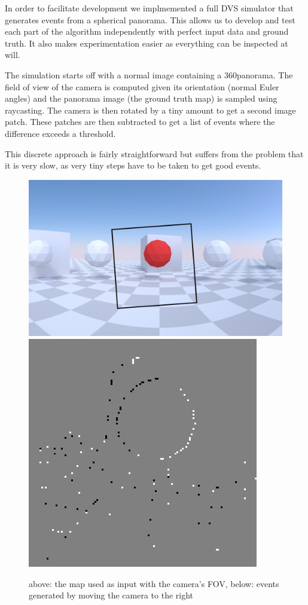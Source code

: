In order to facilitate development we implmemented a full DVS simulator that
generates events from a spherical panorama.  This allows us to develop and test
each part of the algorithm independently with perfect input data and ground
truth. It also makes experimentation easier as everything can be inspected at
will.

The simulation starts off with a normal image containing a 360\textdegree panorama.
The field of view of the camera is computed given its orientation (normal Euler angles)
and the panorama image (the ground truth map) is sampled using raycasting.
The camera is then rotated by a tiny amount to get a second image patch.
These patches are then subtracted to get a list of events where the difference exceeds a threshold.

This discrete approach is fairly straightforward but suffers from the problem that it is very slow, as very tiny steps have to be taken to get good events.

\begin{figure}
\label{fig:simulation}
\includegraphics[width=\linewidth]{images/simulation_raw.jpg}
\includegraphics[width=\linewidth]{images/simulation_events.jpg}
\caption{above: the map used as input with the camera's FOV, below: events generated by moving the camera to the right}
\end{figure}
